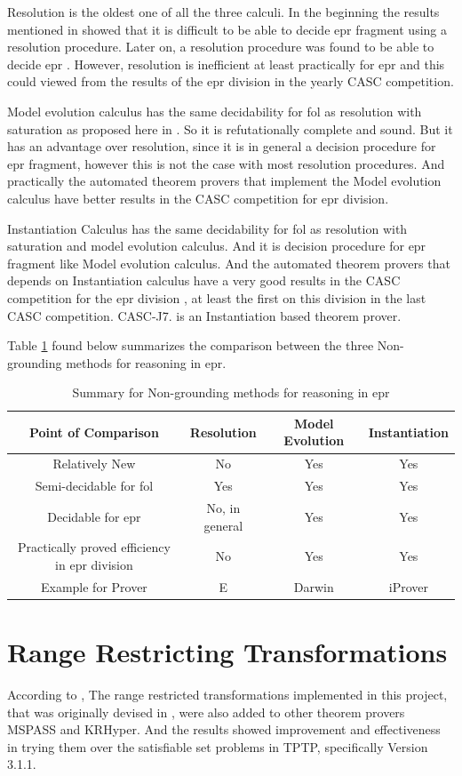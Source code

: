 Resolution is the oldest one of all the three calculi. In the beginning the results mentioned in \cite{RES76} showed that it is difficult to be able to decide \ac{epr} fragment using a resolution procedure. Later on, a resolution procedure was found to be able to decide \ac{epr} \cite{RES93}. However, resolution is inefficient at least practically for \ac{epr} and this could viewed from the results of the \ac{epr} division in the yearly CASC competition.   	   


Model evolution calculus has the same decidability for \ac{fol} as resolution with saturation as proposed here in \cite{BAGA01}. So it is refutationally complete and sound. But it has an advantage over resolution, since it is in general a decision procedure for \ac{epr} fragment, however this is not the case with most resolution procedures. And practically the automated theorem provers that implement the Model evolution calculus have better results in the CASC competition for \ac{epr} division.


Instantiation Calculus has the same decidability for \ac{fol} as resolution with saturation and model evolution calculus. And it is decision procedure for \ac{epr} fragment like Model evolution calculus. And the automated theorem provers that depends on Instantiation calculus have a very good results in the CASC competition for the \ac{epr} division \cite{CASC_24,CASC_J7}, at least the first on this division in the last CASC competition. CASC-J7. is an Instantiation based theorem prover.

 
Table \ref{table:cal_comp} found below summarizes the comparison between the three Non-grounding methods for reasoning in \ac{epr}.

	\begin{table}[H]
		\centering
		\begin{tabular}{||c | c | c | c||} 
 			\hline
			Point of Comparison & Resolution & Model Evolution & Instantiation \\ %
 			\hline\hline
			Relatively New & No & Yes & Yes \\
			Semi-decidable for \ac{fol} & Yes & Yes & Yes \\
			Decidable for \ac{epr} & No, in general & Yes & Yes \\
			Practically proved efficiency in \ac{epr} division & No & Yes & Yes \\ 
			Example for Prover	& E	& Darwin		& iProver \\ [1ex] 
 			\hline
		\end{tabular}
		\caption{Summary for Non-grounding methods for reasoning in \ac{epr}}
		\label{table:cal_comp}
	\end{table}



\section{Range Restricting Transformations}
According to \cite{BMUG06}, The range restricted transformations implemented in this project, that was originally devised in \cite{BMUG06}, were also added to other theorem provers MSPASS and KRHyper. And the results showed improvement and effectiveness in trying them over the satisfiable set problems in TPTP, specifically Version 3.1.1.   

